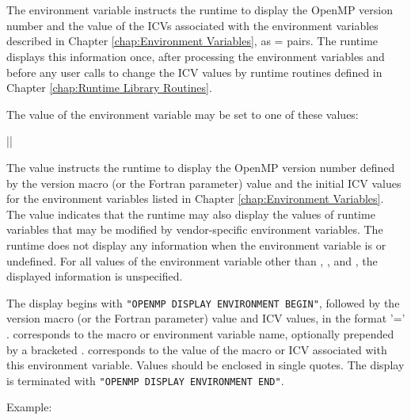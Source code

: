 \section{}
\label{sec:OMP_DISPLAY_ENV}
The  environment variable instructs the runtime to display the
OpenMP version number and the value of the ICVs associated with the environment
variables described in Chapter \ref{chap:Environment Variables},
as  =  pairs. The runtime displays this
information once, after processing the environment variables and before any user calls
to change the ICV values by runtime routines defined in Chapter \ref{chap:Runtime Library Routines}.

The value of the  environment variable may be set to one of these
values:

{||}

The  value instructs the runtime to display the OpenMP version number defined by
the  version macro (or the  Fortran parameter) value and
the initial ICV values for the environment variables listed in
Chapter \ref{chap:Environment Variables}. The 
value indicates that the runtime may also display the values
of runtime variables that may be modified by vendor-specific
environment variables. The runtime does not display any information
when the  environment variable is
 or undefined. For all values of the environment
variable other than , , and ,
the displayed information is unspecified.

The display begins with \texttt{"OPENMP DISPLAY ENVIRONMENT BEGIN"}, followed by
the  version macro (or the  Fortran parameter) value and
ICV values, in the format  '=' .  corresponds to the macro or
environment variable name, optionally prepended by a bracketed . 
corresponds to the value of the macro or ICV associated with this environment variable.
Values should be enclosed in single quotes. The display is terminated with
\texttt{"OPENMP DISPLAY ENVIRONMENT END"}.

Example:
\begin{ompEnv}
\end{ompEnv}

